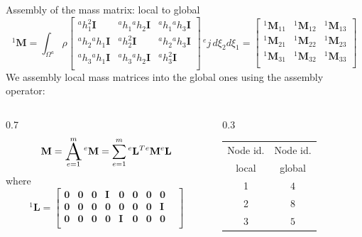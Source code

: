 \documentclass[aspectratio=169]{beamer}
\begin{document}
{\begin{frame}{Assembly of the mass matrix: local to global}
  \vspace{-0.7cm}
  $$
    {}^1\mathbf M
    = \int_{\Omega^a} \rho\begin{bmatrix}
      {}^a h_1^2 \mathbf I      & {}^a h_1{}^a h_2 \mathbf I & {}^a h_1{}^a h_3 \mathbf I \\
      {}^ah_2{}^a h_1 \mathbf I & {}^a h_2^2 \mathbf I       & {}^a h_2{}^a h_3 \mathbf I \\
      {}^ah_3{}^a h_1 \mathbf I & {}^a h_3{}^a h_2 \mathbf I & {}^a h_3^2 \mathbf I       \\
    \end{bmatrix} \, {}^ej \, d\xi_2d\xi_1=\begin{bmatrix}
      {}^1\mathbf M_{11} & {}^1\mathbf M_{12} & {}^1\mathbf M_{13} \\
      {}^1\mathbf M_{21} & {}^1\mathbf M_{22} & {}^1\mathbf M_{23} \\
      {}^1\mathbf M_{31} & {}^1\mathbf M_{32} & {}^1\mathbf M_{33} \\
    \end{bmatrix}$$
  We assembly local mass matrices into the global ones using the assembly operator:
  \begin{columns}
    \begin{column}{0.7\textwidth}
      \vspace{0.5cm}
      $$    \mathbf M =\A_{e=1}^m {}^e\mathbf M = \sum_{e=1}^{m} {}^e\mathbf L^T {}^e\mathbf M{}^e\mathbf L$$
      \hspace{0.7cm}where
      $${}^1\mathbf L=\begin{bmatrix}
          \mathbf 0 & \mathbf 0 & \mathbf 0 & \mathbf I & \mathbf 0 & \mathbf 0 & \mathbf 0 & \mathbf 0 & \\
          \mathbf 0 & \mathbf 0 & \mathbf 0 & \mathbf 0 & \mathbf 0 & \mathbf 0 & \mathbf 0 & \mathbf I & \\
          \mathbf 0 & \mathbf 0 & \mathbf 0 & \mathbf 0 & \mathbf I & \mathbf 0 & \mathbf 0 & \mathbf 0 & \\
        \end{bmatrix}$$
    \end{column}
    \hspace{1cm}
    \begin{column}{0.3\textwidth}
      \begin{tabular}{c|c}
        Node  id. & Node  id. \\
        local     & global    \\\hline
        1         & $4$       \\
        2         & $8$       \\
        3         & $5$       \\
      \end{tabular}
    \end{column}
  \end{columns}
\end{frame}

}
\end{document}
